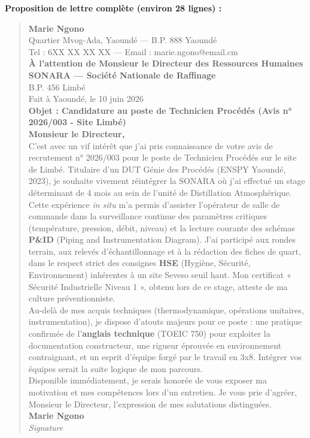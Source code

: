 \documentclass[11pt]{article}
\begin{document}
\begin{corrige}
\textbf{Proposition de lettre complète (environ 28 lignes) :}
\begin{quote}
\textbf{Marie Ngono} \\
Quartier Mvog-Ada, Yaoundé — B.P. 888 Yaoundé \\
Tel : 6XX XX XX XX — Email : marie.ngono@email.cm \\[0.5em]
\textbf{À l'attention de Monsieur le Directeur des Ressources Humaines} \\
\textbf{SONARA — Société Nationale de Raffinage} \\
B.P. 456 Limbé \\[0.5em]
Fait à Yaoundé, le 10 juin 2026 \\[0.5em]
\textbf{Objet : Candidature au poste de Technicien Procédés (Avis n° 2026/003 - Site Limbé)} \\[0.5em]
\textbf{Monsieur le Directeur,} \\[0.5em]
C'est avec un vif intérêt que j'ai pris connaissance de votre avis de recrutement n° 2026/003 pour le poste de Technicien Procédés sur le site de Limbé. Titulaire d'un DUT Génie des Procédés (ENSPY Yaoundé, 2023), je souhaite vivement réintégrer la SONARA où j'ai effectué un stage déterminant de 4 mois au sein de l'unité de Distillation Atmosphérique. \\[0.5em]
Cette expérience \emph{in situ} m'a permis d'assister l'opérateur de salle de commande dans la surveillance continue des paramètres critiques (température, pression, débit, niveau) et la lecture courante des schémas \textbf{P\&ID} (Piping and Instrumentation Diagram). J'ai participé aux rondes terrain, aux relevés d'échantillonnage et à la rédaction des fiches de quart, dans le respect strict des consignes \textbf{HSE} (Hygiène, Sécurité, Environnement) inhérentes à un site Seveso seuil haut. Mon certificat « Sécurité Industrielle Niveau 1 », obtenu lors de ce stage, atteste de ma culture préventionniste. \\[0.5em]
Au-delà de mes acquis techniques (thermodynamique, opérations unitaires, instrumentation), je dispose d'atouts majeurs pour ce poste : une pratique confirmée de l'\textbf{anglais technique} (TOEIC 750) pour exploiter la documentation constructeur, une rigueur éprouvée en environnement contraignant, et un esprit d'équipe forgé par le travail en 3x8. Intégrer vos équipes serait la suite logique de mon parcours. \\[0.5em]
Disponible immédiatement, je serais honorée de vous exposer ma motivation et mes compétences lors d'un entretien. Je vous prie d'agréer, Monsieur le Directeur, l'expression de mes salutations distinguées. \\[1em]
\textbf{Marie Ngono} \\
\textit{Signature}
\end{quote}


\end{corrige}
\end{document}
